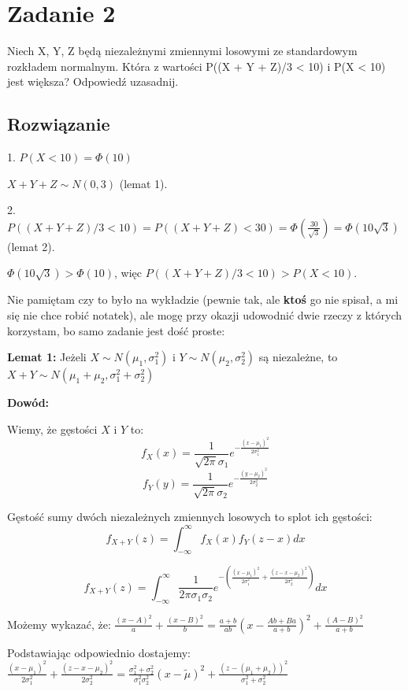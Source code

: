 \section{Zadanie 2}
Niech X, Y, Z będą niezależnymi zmiennymi losowymi ze standardowym rozkładem normalnym. Która z wartości P((X + Y + Z)/3 < 10) i P(X < 10) jest większa?
Odpowiedź uzasadnij.

\subsection*{Rozwiązanie}
1. \(P(X < 10) = \Phi(10)\)

\(X + Y + Z \sim N(0, 3)\) (lemat 1).

2. \(P((X + Y + Z)/3 < 10) = P((X + Y + Z) < 30) = \Phi(\frac{30}{\sqrt{3}}) = \Phi(10 \sqrt{3})\) (lemat 2).

\(\Phi(10 \sqrt{3}) > \Phi(10)\), więc \(P((X + Y + Z)/3 < 10) > P(X < 10)\).

Nie pamiętam czy to było na wykładzie (pewnie tak, ale \textbf{ktoś} go nie spisał, a mi się nie chce robić notatek), ale mogę przy okazji udowodnić dwie rzeczy z których korzystam,
bo samo zadanie jest dość proste:

\textbf{Lemat 1:} Jeżeli \(X \sim N(\mu_1, \sigma_1^2)\) i \(Y \sim N(\mu_2, \sigma_2^2)\) są niezależne, to \(X + Y \sim N(\mu_1 + \mu_2, \sigma_1^2 + \sigma_2^2)\)

\textbf{Dowód:}

Wiemy, że gęstości \(X\) i \(Y\) to:
\[f_X(x) = \frac{1}{\sqrt{2 \pi} \sigma_1} e^{-\frac{(x - \mu_1)^2}{2 \sigma_1^2}}\]
\[f_Y(y) = \frac{1}{\sqrt{2 \pi} \sigma_2} e^{-\frac{(y - \mu_2)^2}{2 \sigma_2^2}}\]

Gęstość sumy dwóch niezależnych zmiennych losowych to splot ich gęstości:
\[f_{X+Y}(z) = \int_{-\infty}^{\infty} f_X(x) f_Y(z - x) dx\]

\[f_{X + Y}(z) = \int_{-\infty}^{\infty} \frac{1}{2 \pi \sigma_1 \sigma_2} e^{-\left(\frac{(x - \mu_1)^2}{2 \sigma_1^2} + \frac{(z - x - \mu_2)^2}{2 \sigma_2^2}\right)} dx\]

Możemy wykazać, że: \(\frac{(x - A)^2}{a} + \frac{(x - B)^2}{b} = \frac{a+b}{ab}\left(x - \frac{Ab + Ba}{a+b}\right)^2 + \frac{(A-B)^2}{a+b}\)

Podstawiając odpowiednio dostajemy: \(\frac{(x - \mu_1)^2}{2 \sigma_1^2} + \frac{(z - x - \mu_2)^2}{2 \sigma_2^2} = \frac{\sigma_1^2 + \sigma_2^2}{\sigma_1^2 \sigma_2^2} \left( x - \tilde{\mu} \right)^2 + \frac{(z - (\mu_1 + \mu_2))^2}{\sigma_1^2 + \sigma_2^2}\)

